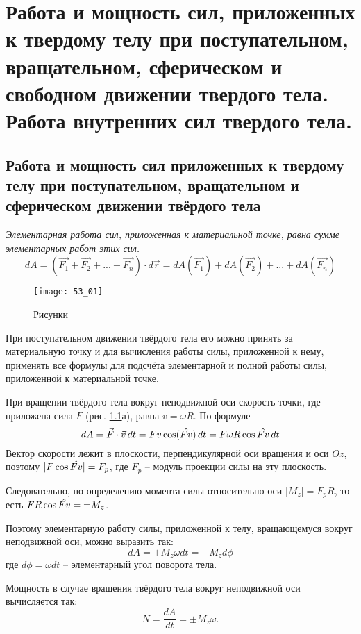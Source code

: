 \chapter{Работа и мощность сил, приложенных к твердому телу при поступательном,
вращательном, сферическом и свободном движении твердого тела. Работа
внутренних сил твердого тела.}

\section{Работа и мощность сил приложенных к твердому телу при поступательном, 
вращательном и сферическом движении твёрдого тела}

\emph{Элементарная работа сил, приложенная к материальной точке, равна сумме 
элементарных работ этих сил.}
\[ 
	dA = \left( \vec{F_1} + \vec{F_2} + ... + \vec{F_n} \right)\cdot d\vec{r} =
	dA(\vec{F_1}) + dA(\vec{F_2}) + ... + dA(\vec{F_n})
\]

\begin{figure}[h!]
	\center
    \texttt{[image: 53\_01]}
    \caption{Рисунки}
    \label{pic53_01}
\end{figure}

При поступательном движении твёрдого тела его можно принять за материальную 
точку и для вычисления работы силы, приложенной к нему, применять все 
формулы для подсчёта элементарной и полной работы силы, приложенной к 
материальной точке.

При вращении твёрдого тела вокруг неподвижной оси скорость точки, где приложена 
сила \( F \) (рис. \ref{pic53_01}а), равна \( v = \omega R \). По формуле
\[ 
	dA = \vec{F}\cdot\vec{v}\,dt = Fv\cos(\hat{Fv})\,dt = 
	F\omega R\cos{\Hat{Fv}}\,dt
\]
Вектор скорости лежит в плоскости, перпендикулярной оси вращения и оси \( Oz \), 
поэтому \( |F\cos\Hat{Fv}| = F_p \), где \( F_p \) -- модуль проекции силы на эту 
плоскость. 

Следовательно, по определению момента силы относительно оси 
\( |M_z| = F_p R\), то есть \( FR\cos\Hat{Fv} = \pm M_z \).

Поэтому элементарную работу силы, приложенной к телу, вращающемуся вокруг 
неподвижной оси, можно выразить так:
\[
	dA = \pm M_z\omega dt = \pm M_zd\phi
\]
где \( d\phi = \omega dt \) -- элементарный угол поворота тела.

Мощность в случае вращения твёрдого тела вокруг неподвижной оси 
вычисляется так:
\[
	N = \frac{dA}{dt} = \pm M_z\omega.
\]

